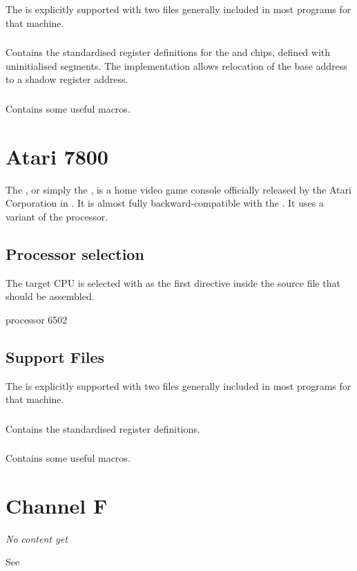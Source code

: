 The  is explicitly supported with two files generally included in most programs for that machine.

\subsubsection{}

Contains the standardised register definitions for the  and  chips, defined with uninitialised segments. The implementation allows relocation of the  base address to a shadow register address.

\subsubsection{}
\label{support6502}

Contains some useful macros.

\section{Atari 7800}
\label{machine:atari7800}

The , or simply the , is a home video game console officially released by the Atari Corporation in . It is almost fully backward-compatible with the . It uses a variant of the  processor.

\subsection{Processor selection}

The target CPU is selected with 
as the first directive inside the source file that should be assembled.

\begin{usage}
	processor 6502
\end{usage}

\subsection{Support Files}

The  is explicitly supported with two files generally included in most programs for that machine.

\subsubsection{}

Contains the standardised register definitions.

\subsubsection{}

Contains some useful macros.


\section{Channel F}
\label{machine:channelF}

\label{changelog:20200906f8}

\emph{No content yet}

See 
